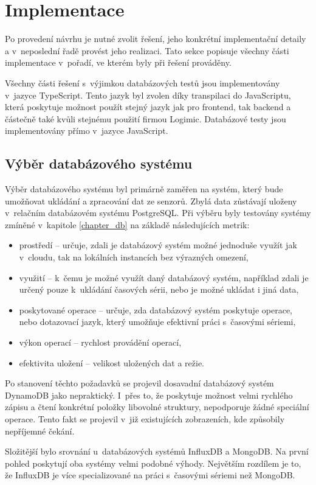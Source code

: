 \chapter{Implementace}
\label{chapter_implemenatation}
Po provedení návrhu je nutné zvolit řešení, jeho konkrétní implementační detaily a v~neposlední řadě provést jeho realizaci. Tato sekce popisuje všechny části implementace v~pořadí, ve kterém byly při řešení prováděny.

Všechny části řešení s~výjimkou databázových testů jsou implementovány v~jazyce TypeScript. Tento jazyk byl zvolen díky transpilaci do JavaScriptu, která poskytuje možnost použít stejný jazyk jak pro frontend, tak backend a částečně také kvůli stejnému použití firmou Logimic. Databázové testy jsou implementovány přímo v~jazyce JavaScript. 
\section{Výběr databázového systému}
Výběr databázového systému byl primárně zaměřen na systém, který bude umožňovat ukládání a zpracování dat ze senzorů. Zbylá data zůstávají uloženy v~relačním databázovém systému PostgreSQL. Při výběru byly testovány systémy zmíněné v~kapitole \ref{chapter_db} na základě následujících metrik:
\begin{itemize}
\item prostředí -- určuje, zdali je databázový systém možné jednoduše využít jak v~cloudu, tak na lokálních instancích bez výrazných omezení,
\item využití -- k~čemu je možné využít daný databázový systém, například zdali je určený pouze k~ukládání časových sérii, nebo je možné ukládat i jiná data,
\item poskytované operace -- určuje, zda databázový systém poskytuje operace, nebo dotazovací jazyk, který umožňuje efektivní práci s~časovými sériemi,
\item výkon operací -- rychlost provádění operací,
\item efektivita uložení -- velikost uložených dat a režie.
\end{itemize}
Po stanovení těchto požadavků se projevil dosavadní databázový systém DynamoDB jako nepraktický. I~přes to, že poskytuje možnost velmi rychlého zápisu a čtení konkrétní položky libovolné struktury, nepodporuje žádné speciální operace. Tento fakt se projevil v~již existujících zobrazeních, kde způsobily nepříjemné čekání.

Složitější bylo srovnání u~databázových systémů InfluxDB a MongoDB. Na první pohled poskytují oba systémy velmi podobné výhody. Největším rozdílem je to, že InfluxDB je více specializované na práci s~časovými sériemi než MongoDB.

